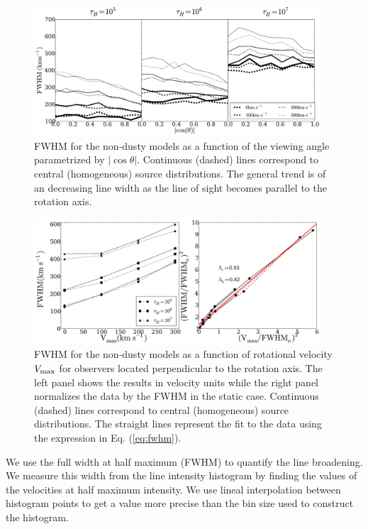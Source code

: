 \documentclass{emulateapj}
\begin{document}
\begin{figure}
\begin{center}
  \includegraphics[width=0.95\textwidth]{f6.pdf}
\end{center}
  \caption{FWHM for the non-dusty models as a function of the viewing
  angle parametrized by $|\cos\theta|$. Continuous (dashed) lines  correspond
  to central (homogeneous) source distributions. The general trend is
  of an decreasing line width as the line of sight becomes parallel to the
  rotation axis.
  \label{fig:widthvsmu}} 
\end{figure}

\begin{figure}
\begin{center}
  \includegraphics[width=0.95\textwidth]{f7.pdf}
\end{center}
\caption{FWHM for the non-dusty models as a function of
  rotational velocity $V_{\rm max}$ for observers located
  perpendicular to the rotation axis. 
  The left panel shows the results in velocity units while the right
  panel normalizes the data by the FWHM in the static case. 
  Continuous (dashed) lines  correspond to central (homogeneous)
  source distributions. 
  The straight lines represent the fit to the data using the
  expression in Eq. (\ref{eq:fwhm}). 
  \label{fig:widthsvsvelocity}}
\end{figure}


We use the full width at half maximum (FWHM) to quantify the line
broadening. 
We measure this width from the line intensity histogram by finding the
values of the velocities at half maximum intensity.
We use lineal interpolation between histogram points to get a value
more precise than the bin size used to construct the histogram. 
\end{document}
